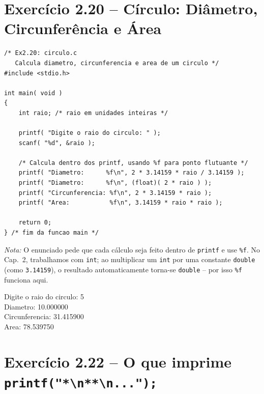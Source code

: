 \documentclass[12pt,a4paper]{article}
\begin{document}
\section{Exercício 2.20 -- Círculo: Diâmetro, Circunferência e Área}

\begin{respostabox}[title={Exercício 2.20 -- Propriedades do círculo}]
\begin{lstlisting}
/* Ex2.20: circulo.c
   Calcula diametro, circunferencia e area de um circulo */
#include <stdio.h>

int main( void )
{
    int raio; /* raio em unidades inteiras */

    printf( "Digite o raio do circulo: " );
    scanf( "%d", &raio );

    /* Calcula dentro dos printf, usando %f para ponto flutuante */
    printf( "Diametro:      %f\n", 2 * 3.14159 * raio / 3.14159 );
    printf( "Diametro:      %f\n", (float)( 2 * raio ) );
    printf( "Circunferencia: %f\n", 2 * 3.14159 * raio );
    printf( "Area:           %f\n", 3.14159 * raio * raio );

    return 0;
} /* fim da funcao main */
\end{lstlisting}

\textit{Nota:} O enunciado pede que cada cálculo seja feito dentro de \texttt{printf}
e use \texttt{\%f}. No Cap.~2, trabalhamos com \texttt{int}; ao multiplicar um \texttt{int}
por uma constante \texttt{double} (como \texttt{3.14159}), o resultado automaticamente
torna-se \texttt{double} -- por isso \texttt{\%f} funciona aqui.

\begin{saida}
Digite o raio do circulo: 5\\
Diametro:      10.000000\\
Circunferencia: 31.415900\\
Area:           78.539750
\end{saida}
\end{respostabox}

\section{Exercício 2.22 -- O que imprime \texttt{printf("*\textbackslash n**\textbackslash n...");}}
\end{document}
